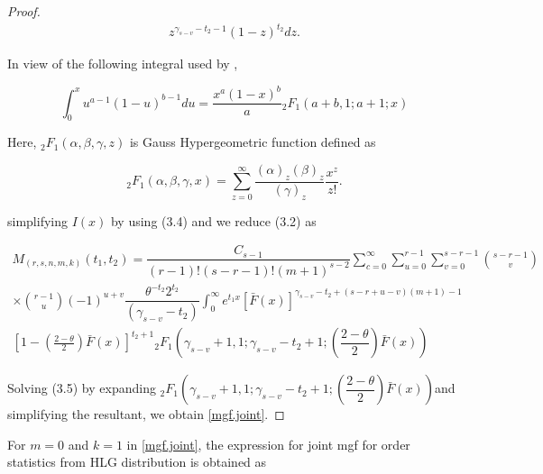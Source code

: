 \documentclass[11pt,a4paper]{article}
\numberwithin{equation}{section}
\begin{document}
\begin{proof}
\begin{eqnarray}
			{z^{\gamma_{s-v}-t_{2}-1}}(1-z)^{t_{2}}dz.

		\end{eqnarray}

		In view of the following integral used by \cite{dutka1981incomplete},

		\begin{equation}

			\int_{0}^{x}u^{a-1}(1-u)^{b-1}du=\dfrac{x^{a}(1-x)^b}{a}{}_{2}F_{1}(a+b,1;a+1;x)

		\end{equation}

		Here, $ {}_{2}F_{1}\left(\alpha,\beta,\gamma,z\right)$ is Gauss Hypergeometric function defined as

		\begin{equation}

			{}_{2}F_{1}\left(\alpha,\beta,\gamma,x\right)=\sum_{z=0}^{\infty}\dfrac{(\alpha)_{z}(\beta)_{z}}{(\gamma)_{z}}\frac{x^{z}}{z!}.\nonumber

		\end{equation}

		simplifying $I(x)$ by using (3.4) and we reduce (3.2) as

		\begin{eqnarray}  

			M_{\left(r,s,n,m,k\right)}({t_{1},t_{2}})= \dfrac{C_{s-1} }{\left(r-1\right)!\left(s-r-1\right)!(m+1)^{s-2}}\sum_{c=0}^{\infty}\sum_{u=0}^{r-1}\sum_{v=0}^{s-r-1}\binom{s-r-1}{v}\nonumber\\

			\times\binom{r-1}{u}(-1)^{u+v}\dfrac{\theta^{-t_{2}}2^{t_{2}}}{\left(\gamma_{s-v}-t_{2}\right)}\int_{0}^{\infty}e^{t_{1}x}\left[\bar{F}\left(x\right)\right]^{\gamma_{s-v}-t_{2}+(s-r+u-v)(m+1)-1}\nonumber\\

			\left[1-\left(\frac{2-\theta}{2}\right)\bar{F}\left(x\right)\right]^{t_{2}+1}{}_{2}F_{1}\left(\gamma_{s-v}+1,1;\gamma_{s-v}-t_{2}+1;\left(\dfrac{2-\theta}{2}\right)\bar{F}\left(x\right)\right)

		\end{eqnarray}

		Solving (3.5) by expanding ${}_{2}F_{1}\left(\gamma_{s-v}+1,1;\gamma_{s-v}-t_{2}+1;\left(\dfrac{2-\theta}{2}\right)\bar{F}\left(x\right)\right)$and simplifying the resultant, we obtain \eqref{mgf.joint}.

	\end{proof}

\noindent For $m=0$ and $k=1$ in \eqref{mgf.joint}, the expression for joint mgf for order statistics from HLG distribution is obtained as
\end{document}
